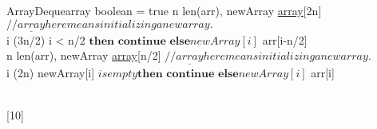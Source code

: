 \documentclass[addpoints]{exam}
\begin{document}
\begin{questions}
\begin{solution}
\begin{pseudocode}{ArrayDeque}{array}
				\IF boolean = true \THEN 
				\BEGIN 
				n \GETS len(arr), 
				newArray \GETS \underline{array}[2n] $ //\underline{array} here means initializing a new array.$\\
				\FOR i  \TO (3{n/2}) \DO
						\IF i < {n/2} $ \textbf{then continue}$
						$ \textbf{else} newArray[i]$ \GETS arr[i-{n/2}]\\
				\END
				\ELSE 
				\BEGIN
					n \GETS len(arr), 
					newArray \GETS \underline{array}[n/2] $ //\underline{array} here means initializing a new array.$\\
					\FOR i  \TO (2n) \DO
					\IF newArray[i] $ is empty \textbf{then continue}$
					$ \textbf{else} newArray[i]$ \GETS arr[i]\\
				\END 
			\ENDPROCEDURE\\
		\end{pseudocode}
	\end{solution}
	\pagebreak
	
	[10]
	

\end{questions}
\end{document}
